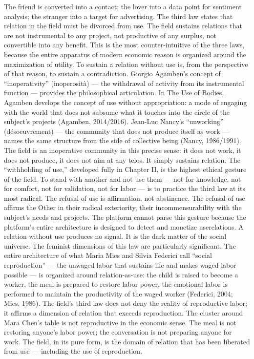 The friend is converted into a contact; the lover into a data point for sentiment analysis; the stranger into a target for advertising. The third law states that relation in the field must be divorced from use. The field sustains relations that are not instrumental to any project, not productive of any surplus, not convertible into any benefit. This is the most counter-intuitive of the three laws, because the entire apparatus of modern economic reason is organized around the maximization of utility. To sustain a relation without use is, from the perspective of that reason, to sustain a contradiction. Giorgio Agamben’s concept of “inoperativity” (inoperosità) — the withdrawal of activity from its instrumental function — provides the philosophical articulation. In The Use of Bodies, Agamben develops the concept of use without appropriation: a mode of engaging with the world that does not subsume what it touches into the circle of the subject’s projects (Agamben, 2014/2016). Jean-Luc Nancy’s “unworking” (désoeuvrement) — the community that does not produce itself as work — names the same structure from the side of collective being (Nancy, 1986/1991). The field is an inoperative community in this precise sense: it does not work, it does not produce, it does not aim at any telos. It simply sustains relation. The “withholding of use,” developed fully in Chapter II, is the highest ethical gesture of the field. To stand with another and not use them — not for knowledge, not for comfort, not for validation, not for labor — is to practice the third law at its most radical. The refusal of use is affirmation, not abstinence. The refusal of use affirms the Other in their radical exteriority, their incommensurability with the subject’s needs and projects. The platform cannot parse this gesture because the platform’s entire architecture is designed to detect and monetize userelations. A relation without use produces no signal. It is the dark matter of the social universe. The feminist dimensions of this law are particularly significant. The entire architecture of what Maria Mies and Silvia Federici call “social reproduction” — the unwaged labor that sustains life and makes waged labor possible — is organized around relation-as-use: the child is raised to become a worker, the meal is prepared to restore labor power, the emotional labor is performed to maintain the productivity of the waged worker (Federici, 2004; Mies, 1986). The field’s third law does not deny the reality of reproductive labor; it affirms a dimension of relation that exceeds reproduction. The cluster around Mara Chen’s table is not reproductive in the economic sense. The meal is not restoring anyone’s labor power; the conversation is not preparing anyone for work. The field, in its pure form, is the domain of relation that has been liberated from use — including the use of reproduction.

